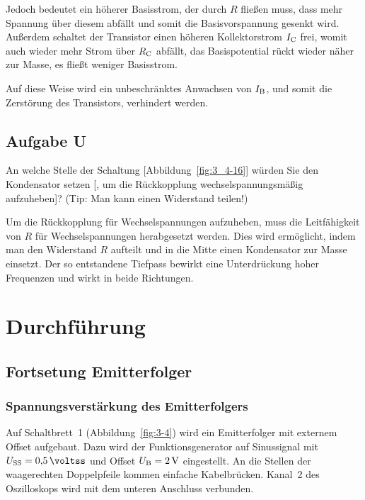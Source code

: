 Jedoch bedeutet ein höherer Basisstrom, der durch $R$ fließen muss, dass mehr
Spannung über diesem abfällt und somit die Basisvorspannung gesenkt wird.
Außerdem schaltet der Transistor einen höheren Kollektorstrom $\IC$ frei, womit
auch wieder mehr Strom über $\RC$ abfällt, das Basispotential rückt wieder
näher zur Masse, es fließt weniger Basisstrom.

Auf diese Weise wird ein unbeschränktes Anwachsen von $\IB$, und somit die
Zerstörung des Transistors, verhindert werden.

\FloatBarrier
\subsection{Aufgabe U}

\begin{problem}
    An welche Stelle der Schaltung [Abbildung~\ref{fig:3_4-16}] würden Sie den
    Kondensator setzen [, um die Rückkopplung wechselspannungsmäßig
    aufzuheben]? (Tip: Man kann einen Widerstand teilen!)
\end{problem}

Um die Rückkopplung für Wechselspannungen aufzuheben, muss die Leitfähigkeit
von $R$ für Wechselspannungen herabgesetzt werden. Dies wird ermöglicht, indem
man den Widerstand $R$ aufteilt und in die Mitte einen Kondensator zur Masse
einsetzt. Der so entstandene Tiefpass bewirkt eine Unterdrückung hoher
Frequenzen und wirkt in beide Richtungen.


\FloatBarrier
\section{Durchführung}

\FloatBarrier
\subsection{Fortsetung Emitterfolger}

\subsubsection{Spannungsverstärkung des Emitterfolgers}

Auf Schaltbrett~1 (Abbildung~\ref{fig:3-4}) wird ein Emitterfolger mit externem
Offset aufgebaut. Dazu wird der Funktionsgenerator auf Sinussignal mit
$U_\text{SS} = \SI{0.5}{\voltss}$ und Offset $\UB = \SI2{\volt}$ eingestellt.
An die Stellen der waagerechten Doppelpfeile kommen einfache Kabelbrücken.
Kanal~2 des Oszilloskops wird mit dem unteren Anschluss verbunden.

